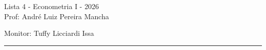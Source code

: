 \documentclass[12pt,letterpaper, onecolumn]{exam}
\begin{document}
\begingroup  
    \centering
    \LARGE Lista 4 - Econometria I - 2026\\[0.5em]
    \large Prof: André Luiz Pereira Mancha \par
    \large Monitor: Tuffy Licciardi Issa  \par
\endgroup
\rule{\textwidth}{0.4pt}
\pointsdroppedatright   %
\printanswers
\renewcommand{\solutiontitle}{\noindent\textbf{Ans:}\enspace}   %
\newcommand{\qstar}{\hspace{-0.6em}\textsuperscript{*}\hspace{0.2em}}
\end{document}
